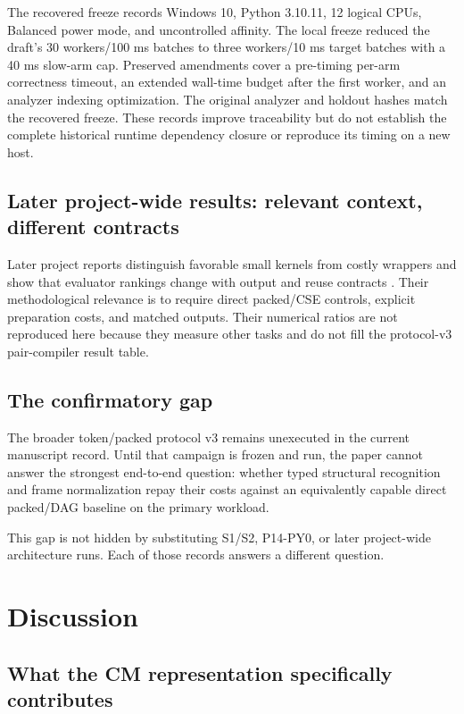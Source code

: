 \documentclass[10pt]{article}
\theoremstyle{plain}
\theoremstyle{definition}
\theoremstyle{remark}
\begin{document}
The recovered freeze records Windows 10, Python 3.10.11, 12 logical CPUs, Balanced power mode, and uncontrolled affinity. The local freeze reduced the draft's 30 workers/100 ms batches to three workers/10 ms target batches with a 40 ms slow-arm cap. Preserved amendments cover a pre-timing per-arm correctness timeout, an extended wall-time budget after the first worker, and an analyzer indexing optimization. The original analyzer and holdout hashes match the recovered freeze. These records improve traceability but do not establish the complete historical runtime dependency closure or reproduce its timing on a new host.

\subsection{Later project-wide results: relevant context, different contracts}
\label{sec:later-context}

Later project reports distinguish favorable small kernels from costly wrappers and show that evaluator rankings change with output and reuse contracts \cite{ProjectCorrection20260825,ProjectArchitecture20260903}. Their methodological relevance is to require direct packed/CSE controls, explicit preparation costs, and matched outputs. Their numerical ratios are not reproduced here because they measure other tasks and do not fill the protocol-v3 pair-compiler result table.

\subsection{The confirmatory gap}

The broader token/packed protocol v3 remains unexecuted in the current manuscript record. Until that campaign is frozen and run, the paper cannot answer the strongest end-to-end question: whether typed structural recognition and frame normalization repay their costs against an equivalently capable direct packed/DAG baseline on the primary workload.

This gap is not hidden by substituting S1/S2, P14-PY0, or later project-wide architecture runs. Each of those records answers a different question.

\section{Discussion}
\label{sec:discussion}

\subsection{What the CM representation specifically contributes}
\end{document}
